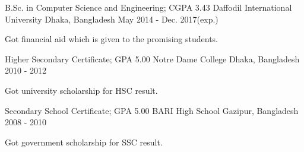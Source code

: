 
\begin{cventries}
  \cventry
    {B.Sc. in Computer Science and Engineering; CGPA 3.43}
    {Daffodil International University}
    {Dhaka, Bangladesh}
    {May 2014 - Dec. 2017(exp.)}
    {
      \begin{cvitems}
        \item {Got financial aid which is given to the promising students.}
      \end{cvitems}
    }


  \cventry
    {Higher Secondary Certificate; GPA 5.00}
    {Notre Dame College}
    {Dhaka, Bangladesh}
    {2010 - 2012}
    {
      \begin{cvitems}
        \item {Got university scholarship for HSC result.}
      \end{cvitems}
    }


  \cventry
    {Secondary School Certificate; GPA 5.00}
    {BARI High School}
    {Gazipur, Bangladesh}
    {2008 - 2010}
    {
      \begin{cvitems}
        \item {Got government scholarship for SSC result.}
      \end{cvitems}
    }
\end{cventries}
